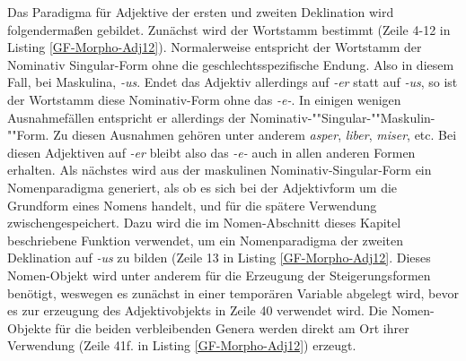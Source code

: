 Das Paradigma für Adjektive der ersten und zweiten Deklination wird folgendermaßen gebildet. Zunächst wird der Wortstamm bestimmt (Zeile 4-12 in Listing \ref{GF-Morpho-Adj12}). Normalerweise entspricht der Wortstamm der Nominativ Singular-Form ohne die geschlechtsspezifische Endung. Also in diesem Fall, bei Maskulina, \textit{-us}. Endet das Adjektiv allerdings auf \textit{-er} statt auf \textit{-us}, so ist der Wortstamm diese Nominativ-Form ohne das \textit{-e-}. In einigen wenigen Ausnahmefällen entspricht er allerdings der Nominativ-""Singular-""Maskulin-""Form. Zu diesen Ausnahmen gehören unter anderem \textit{asper}, \textit{liber}, \textit{miser}, etc. Bei diesen Adjektiven auf \textit{-er} bleibt also das \textit{-e-} auch in allen anderen Formen erhalten. Als nächstes wird aus der maskulinen Nominativ-Singular-Form ein Nomenparadigma generiert, als ob es sich bei der Adjektivform um die Grundform eines Nomens handelt, und für die spätere Verwendung zwischengespeichert. Dazu wird die im Nomen-Abschnitt dieses Kapitel beschriebene Funktion verwendet, um ein Nomenparadigma der zweiten Deklination auf \textit{-us} zu bilden (Zeile 13 in Listing \ref{GF-Morpho-Adj12}. Dieses Nomen-Objekt wird unter anderem für die Erzeugung der Steigerungsformen benötigt, weswegen es zunächst in einer temporären Variable abgelegt wird, bevor es zur erzeugung des Adjektivobjekts in Zeile 40 verwendet wird. Die Nomen-Objekte für die beiden verbleibenden Genera werden direkt am Ort ihrer Verwendung (Zeile 41f. in Listing \ref{GF-Morpho-Adj12}) erzeugt. \par
\FloatBarrier
